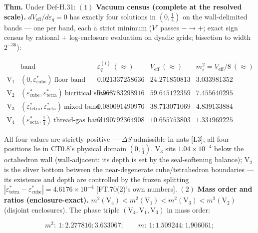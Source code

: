 \begin{theorem}\label{tag:FT-103}
\textbf{Thm.} Under Def-H.31: $(1)$ \textbf{Vacuum census (complete at the resolved scale).} $dV_{\mathrm{eff}}/d\varepsilon_q=0$ has exactly four solutions in $(0,\tfrac14)$ on the wall-delimited bands — one per band, each a strict minimum ($V'$ passes $-\to+$; exact sign census by rational $+$ log-enclosure evaluation on dyadic grids; bisection to width $2^{-36}$):

\[
\begin{array}{c|c|c|c|c}
&\text{band}&\varepsilon_q^{(i)}\ (\approx)&V_{\mathrm{eff}}\ (\approx)&m_i^2=V_{\mathrm{eff}}/8\ (\approx)\\ \hline
\mathrm V_1&(0,\varepsilon^*_{\mathrm{cube}})\ \text{floor band}&0.021337258636&24.271850813&3.033981352\\
\mathrm V_2&(\varepsilon^*_{\mathrm{cube}},\varepsilon^*_{\mathrm{tetra}})\ \text{bicritical sliver}&0.068783298916&59.645122359&7.455640295\\
\mathrm V_3&(\varepsilon^*_{\mathrm{tetra}},\varepsilon^*_{\mathrm{octa}})\ \text{mixed band}&0.080091490970&38.713071069&4.839133884\\
\mathrm V_4&(\varepsilon^*_{\mathrm{octa}},\tfrac14)\ \text{thread-gas band}&0.190792364908&10.655753803&1.331969225
\end{array}
\]

All four values are strictly positive — $\Delta S$-admissible in nats [L3]; all four positions lie in CT0.8's physical domain $(0,\tfrac14)$. $\mathrm V_3$ sits $1.04\times10^{-4}$ below the octahedron wall (wall-adjacent: its depth is set by the seal-softening balance); $\mathrm V_2$ is the sliver bottom between the near-degenerate cube/tetrahedron boundaries — its existence and depth are controlled by the frozen splitting $|\varepsilon^*_{\mathrm{tetra}}-\varepsilon^*_{\mathrm{cube}}|=4.6176\times10^{-4}$ [FT.70(2)'s own numbers]. $(2)$ \textbf{Mass order and ratios (enclosure-exact).} $m^2(\mathrm V_4)<m^2(\mathrm V_1)<m^2(\mathrm V_3)<m^2(\mathrm V_2)$ (disjoint enclosures). The phase triple $(\mathrm V_4,\mathrm V_1,\mathrm V_3)$ in mass order:

\[
m^2:\ 1:2.277816:3.633067;\qquad m:\ 1:1.509244:1.906061;
\]


\end{theorem}
